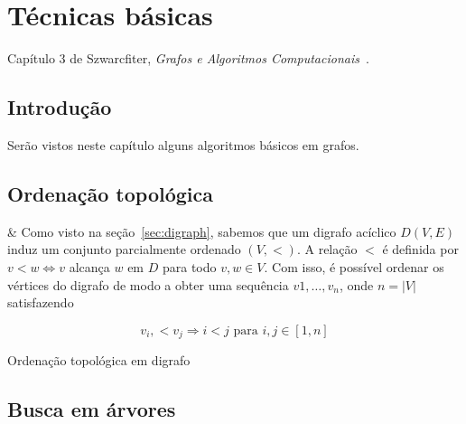 \chapter{Técnicas básicas}

Capítulo 3 de Szwarcfiter, \textit{Grafos e Algoritmos Computacionais}~\cite{Szwarcfiter1986grafos}.

\section{Introdução}

Serão vistos neste capítulo alguns algoritmos básicos em grafos.

\section{Ordenação topológica}


\begin{easylist}

  & Como visto na seção~\ref{sec:digraph}, sabemos que um digrafo acíclico $D(V, E)$ induz um conjunto parcialmente ordenado $(V, <)$. A relação $<$ é definida por $v < w \Leftrightarrow v$ alcança $w$ em $D$ para todo $v, w \in V$. Com isso, é possível ordenar os vértices do digrafo de modo a obter uma sequência $v1, \dots, v_n$, onde $n = |V|$ satisfazendo

  \[ v_i, < v_j \Rightarrow i<j \text{ para } i, j \in [1, n] \]

\begin{algorithm}[H]
\SetAlgoLined
{}
 \caption{Ordenação topológica em digrafo}
\end{algorithm}
  
\end{easylist}

\section{Busca em árvores}

\clearpage

